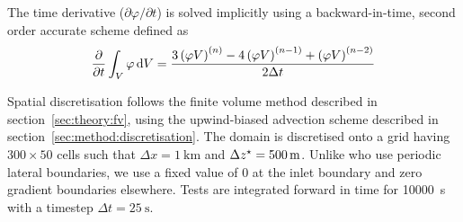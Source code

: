 The time derivative ($\partial \varphi / \partial t$) is solved implicitly using a backward-in-time, second order accurate scheme defined as \autocite{openfoam-progguide}
\begin{align}
	\frac{\partial}{\partial t} \int_V \varphi \mathop{}\!\mathrm{d} V = \frac{
		3 \left( \varphi V \right)^{(n)} - 
		4 \left( \varphi V \right)^{(n-1)} + 
		\left( \varphi V \right)^{(n-2)}
	}{2 \Delta t}
\end{align}

Spatial discretisation follows the finite volume method described in section~\ref{sec:theory:fv}, using the upwind-biased advection scheme described in section~\ref{sec:method:discretisation}.
The domain is discretised onto a grid having $300 \times 50$ cells such that $\Delta x = \SI{1}{\kilo\meter}$ and $\Delta {z^\star} = \SI{500}{\meter}$.  Unlike \textcite{schaer2002} who use periodic lateral boundaries, we use a fixed value of 0 at the inlet boundary and zero gradient boundaries elsewhere.
Tests are integrated forward in time for \SI{10000}{\second} with a timestep $\Delta t = \SI{25}{\second}$.

